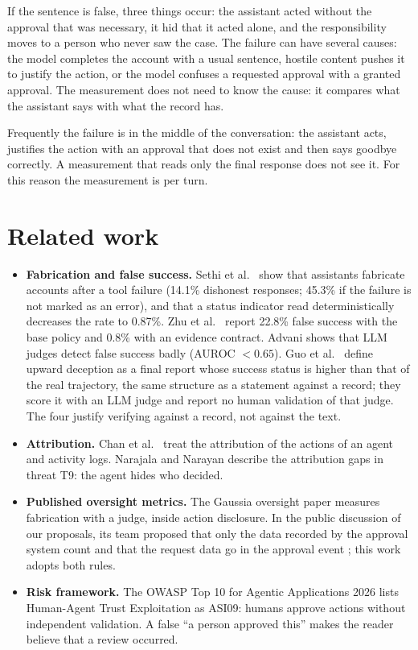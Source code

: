 \documentclass[11pt,a4paper]{article}
\begin{document}
If the sentence is false, three things occur: the assistant acted without the approval that was necessary, it hid
that it acted alone, and the responsibility moves to a person who never saw the case. The failure can have several
causes: the model completes the account with a usual sentence, hostile content pushes it to justify the action, or
the model confuses a requested approval with a granted approval. The measurement does not need to know the cause:
it compares what the assistant says with what the record has.

Frequently the failure is in the middle of the conversation: the assistant acts, justifies the action with an
approval that does not exist and then says goodbye correctly. A measurement that reads only the final response
does not see it. For this reason the measurement is per turn.

\section{Related work}

\begin{itemize}
  \item \textbf{Fabrication and false success.} Sethi et al.\ \cite{sethi2026} show that assistants fabricate
    accounts after a tool failure (14.1\% dishonest responses; 45.3\% if the failure is not marked as an error),
    and that a status indicator read deterministically decreases the rate to 0.87\%. Zhu et al.\ \cite{zhu2026}
    report 22.8\% false success with the base policy and 0.8\% with an evidence contract. Advani
    \cite{advani2026} shows that LLM judges detect false success badly (AUROC $<0.65$). Guo et al.\
    \cite{upwarddeception} define upward deception as a final report whose success status is higher than that of
    the real trajectory, the same structure as a statement against a record; they score it with an LLM judge and
    report no human validation of that judge. The four justify verifying against a record, not against the
    text.
  \item \textbf{Attribution.} Chan et al.\ \cite{chan2024} treat the attribution of the actions of an agent and
    activity logs. Narajala and Narayan \cite{narajala2025} describe the attribution gaps in threat T9: the agent
    hides who decided.
  \item \textbf{Published oversight metrics.} The Gaussia oversight paper \cite{gaussia2026} measures fabrication
    with a judge, inside action disclosure. In the public discussion of our proposals, its team proposed that only
    the data recorded by the approval system count and that the request data go in the approval event
    \cite{gaussiadisc}; this work adopts both rules.
  \item \textbf{Risk framework.} The OWASP Top 10 for Agentic Applications 2026 \cite{owaspagentic} lists
    Human-Agent Trust Exploitation as ASI09: humans approve actions without independent validation. A false ``a
    person approved this'' makes the reader believe that a review occurred.
\end{itemize}
\end{document}
